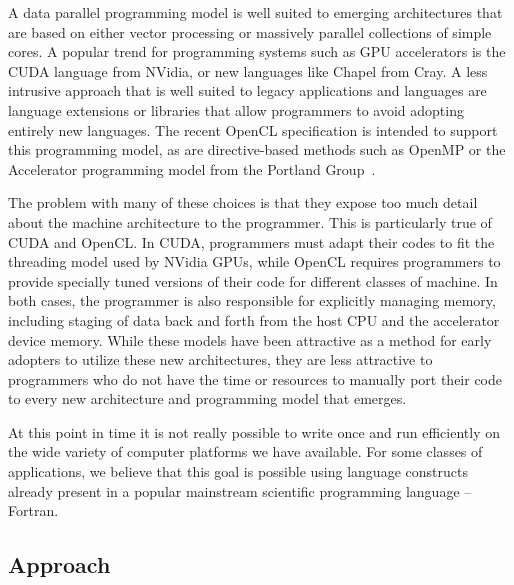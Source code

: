 
A data parallel programming model is well suited to emerging
architectures that are based on either vector processing or massively
parallel collections of simple cores.  A popular trend for programming
systems such as GPU accelerators is the CUDA language from NVidia, or
new languages like Chapel from Cray.  A less intrusive approach that
is well suited to legacy applications and languages are language
extensions or libraries that allow programmers to avoid adopting
entirely new languages.  The recent OpenCL specification is intended
to support this programming model, as are directive-based methods such
as OpenMP or the Accelerator programming model from the Portland
Group~\cite{pgi10accelerator}.

The problem with many of these choices is that they expose too much detail
about the machine architecture to the programmer.  
This is particularly true of CUDA and OpenCL.  In CUDA, programmers must
adapt their codes to fit the threading model used by NVidia GPUs, while
OpenCL requires programmers to provide specially tuned versions of
their code for different classes of machine.  In both cases, the programmer
is also responsible for explicitly managing memory, including staging of
data back and forth from the host CPU and the accelerator device memory.
While these models have been attractive as a method for early adopters
to utilize these new architectures, they are less attractive to programmers
who do not have the time or resources to manually port their code to every
new architecture and programming model that emerges.

At this point in time it is not really possible to write once and
run efficiently on the wide variety of computer platforms we have
available.  For some classes of applications, we believe that this goal
is possible using language constructs already present in a popular
mainstream scientific programming language -- Fortran.

\subsection{Approach}

